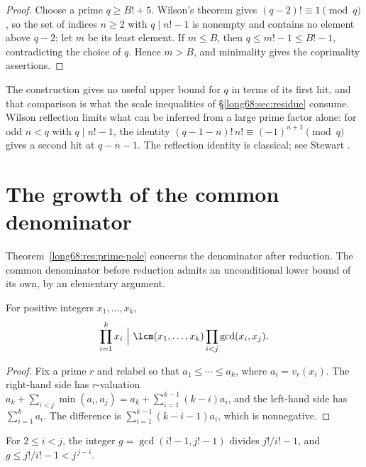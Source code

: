 \begin{proof}
Choose a prime $q\ge B!+5$.  Wilson's theorem gives $(q-2)!\equiv1\pmod q$,
so the set of indices $n\ge2$ with $q\mid n!-1$ is nonempty and contains no
element above $q-2$; let $m$ be its least element.  If $m\le B$, then
$q\le m!-1\le B!-1$, contradicting the choice of $q$.  Hence $m>B$, and
minimality gives the coprimality assertions.
\end{proof}

The construction gives no useful upper bound for $q$ in terms of its first
hit, and that comparison is what the scale inequalities of
\S\ref{long68:sec:residue} consume.  Wilson reflection limits what can be inferred
from a large prime factor alone: for odd $n<q$ with $q\mid n!-1$, the
identity $(q-1-n)!\,n!\equiv(-1)^{n+1}\pmod q$ gives a second hit at
$q-n-1$.  The reflection identity is classical; see Stewart
\cite[p.~462, (4)]{stewart2004}.

\statusboundary

\section{The growth of the common denominator}\label{long68:sec:lcm}

Theorem~\ref{long68:res:prime-pole} concerns the denominator after reduction.  The
common denominator before reduction admits an unconditional lower bound of
its own, by an elementary argument.

\begin{lemma}
\label{long68:res:product-lcm}
For positive integers $x_1,\ldots,x_k$,
\[
 \prod_{i=1}^{k}x_i\ \Big|\ \lcm(x_1,\ldots,x_k)\prod_{i<j}\gcd(x_i,x_j).
\]
\end{lemma}

\begin{proof}
Fix a prime $r$ and relabel so that $a_1\le\cdots\le a_k$, where
$a_i=v_r(x_i)$.  The right-hand side has $r$-valuation
$a_k+\sum_{i<j}\min(a_i,a_j)=a_k+\sum_{i=1}^{k-1}(k-i)a_i$, and the left-hand
side has $\sum_{i=1}^{k}a_i$.  The difference is
$\sum_{i=1}^{k-1}(k-i-1)a_i$, which is nonnegative.
\end{proof}

\begin{lemma}\label{long68:res:gap-gcd}
For $2\le i<j$, the integer $g=\gcd(i!-1,j!-1)$ divides $j!/i!-1$, and
$g\le j!/i!-1<j^{\,j-i}$.
\end{lemma}

